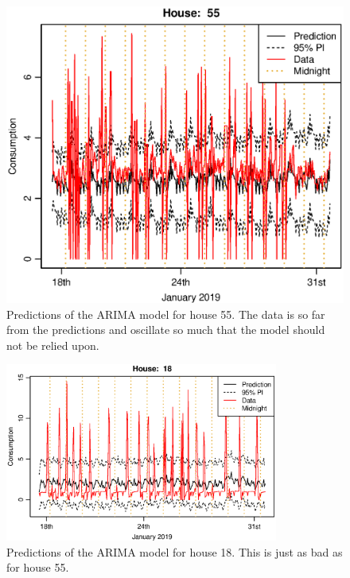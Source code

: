 \begin{figure}[ht]
    \centering
    \includegraphics[scale=0.6]{../../../figures/arimax/arima1_pred_55.eps}
    \caption{Predictions of the ARIMA model for house 55. The data is so far from the predictions and oscillate so much that the model should not be relied upon.}
    \label{fig:arima1_pred_55}
\end{figure}
\begin{figure}[ht]
    \centering
    \includegraphics[width=0.8\textwidth]{../../../figures/arimax/arima1_pred_18.eps}
    \caption{Predictions of the ARIMA model for house 18. This is just as bad as for house 55.}
    \label{fig:arima1_pred_18}
\end{figure}

